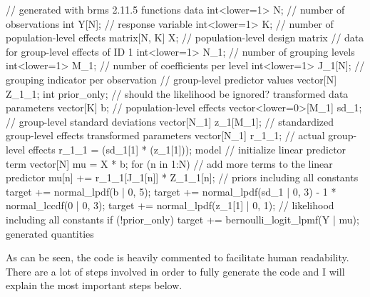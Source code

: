\documentclass[
]{jss}
\begin{document}
\begin{CodeChunk}

\begin{CodeOutput}
// generated with brms 2.11.5
functions {
}
data {
  int<lower=1> N;  // number of observations
  int Y[N];  // response variable
  int<lower=1> K;  // number of population-level effects
  matrix[N, K] X;  // population-level design matrix
  // data for group-level effects of ID 1
  int<lower=1> N_1;  // number of grouping levels
  int<lower=1> M_1;  // number of coefficients per level
  int<lower=1> J_1[N];  // grouping indicator per observation
  // group-level predictor values
  vector[N] Z_1_1;
  int prior_only;  // should the likelihood be ignored?
}
transformed data {
}
parameters {
  vector[K] b;  // population-level effects
  vector<lower=0>[M_1] sd_1;  // group-level standard deviations
  vector[N_1] z_1[M_1];  // standardized group-level effects
}
transformed parameters {
  vector[N_1] r_1_1;  // actual group-level effects
  r_1_1 = (sd_1[1] * (z_1[1]));
}
model {
  // initialize linear predictor term
  vector[N] mu = X * b;
  for (n in 1:N) {
    // add more terms to the linear predictor
    mu[n] += r_1_1[J_1[n]] * Z_1_1[n];
  }
  // priors including all constants
  target += normal_lpdf(b | 0, 5);
  target += normal_lpdf(sd_1 | 0, 3)
    - 1 * normal_lccdf(0 | 0, 3);
  target += normal_lpdf(z_1[1] | 0, 1);
  // likelihood including all constants
  if (!prior_only) {
    target += bernoulli_logit_lpmf(Y | mu);
  }
}
generated quantities {
}
\end{CodeOutput}
\end{CodeChunk}

As can be seen, the  code is heavily commented to
facilitate human readability. There are a lot of steps involved in order
to fully generate the  code and I will explain the most
important steps below.
\end{document}
